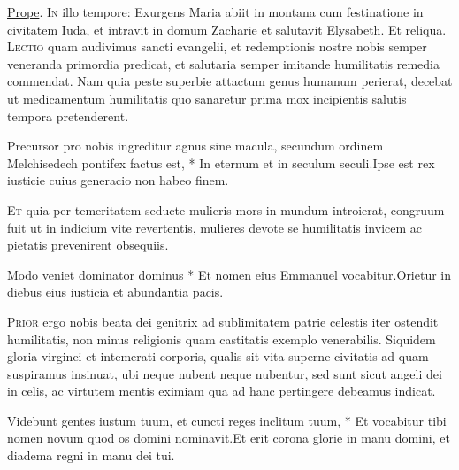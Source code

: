 \begin{multicols*}{2}
 \hyperlink{prope-est-iam-invitatorium}{Prope}.
\lettrine[lines=2]{\zallmancaps \color{Blue} I}{n} illo tempore: Exurgens Maria abiit in montana cum festinatione in civitatem Iuda, et intravit in domum Zacharie et salutavit Elysabeth. Et reliqua.
\lettrine[lines=2]{\zallmancaps \color{Red} L}{ectio} quam audivimus sancti evangelii, et redemptionis nostre nobis semper veneranda primordia predicat, et salutaria semper imitande humilitatis remedia commendat. Nam quia peste superbie attactum genus humanum perierat, decebat ut medicamentum humilitatis quo sanaretur prima mox incipientis salutis tempora pretenderent.
\begin{responsory}
{Precursor pro nobis ingreditur agnus sine macula, secundum ordinem Melchisedech pontifex factus est, * In eternum et in seculum seculi.}{Ipse est rex iusticie cuius generacio non habeo finem.}
\end{responsory}
\lettrine[lines=2]{\zallmancaps \color{Blue} E}{t} quia per temeritatem seducte mulieris mors in mundum introierat, congruum fuit ut in indicium vite revertentis, mulieres devote se humilitatis invicem ac pietatis prevenirent obsequiis.
\begin{responsory}
{Modo veniet dominator dominus * Et nomen eius Emmanuel vocabitur.}{Orietur in diebus eius iusticia et abundantia pacis.}
\end{responsory}
\lettrine[lines=2]{\zallmancaps \color{Red} P}{rior} ergo nobis beata dei genitrix ad sublimitatem patrie celestis iter ostendit humilitatis, non minus religionis quam castitatis exemplo venerabilis. Siquidem gloria virginei et intemerati corporis, qualis sit vita superne civitatis ad quam suspiramus insinuat, ubi neque nubent neque nubentur, sed sunt sicut angeli dei in celis, ac virtutem mentis eximiam qua ad hanc pertingere debeamus indicat.
\begin{responsory-doxology}
{Videbunt gentes iustum tuum, et cuncti reges inclitum tuum, * Et vocabitur tibi nomen novum quod os domini nominavit.}{Et erit corona glorie in manu domini, et diadema regni in manu dei tui.}

\end{responsory-doxology}
\end{multicols*}
